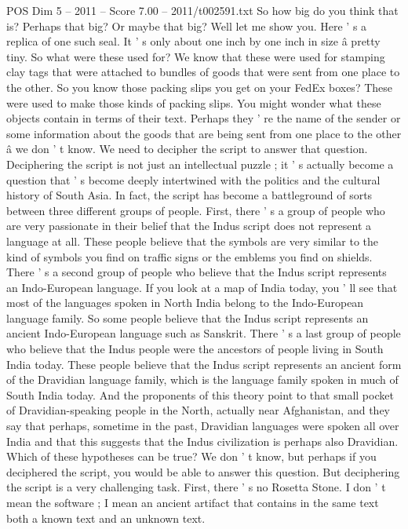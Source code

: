 \begin{textsample}{POS Dim 5 – 2011 – Score 7.00 – 2011/t002591.txt}
So how big do you think that is?
Perhaps that big?
Or maybe that big?
Well let me show you.
Here ' s a replica of one such seal.
It ' s only about one inch by one inch in size â pretty tiny.
So what were these used for?
We know that these were used for stamping clay tags that were attached to bundles of goods that were sent from one place to the other.
So you know those packing slips you get on your FedEx boxes?
These were used to make those kinds of packing slips.
You might wonder what these objects contain in terms of their text.
Perhaps they ' re the name of the sender or some information about the goods that are being sent from one place to the other â we don ' t know.
We need to decipher the script to answer that question.
Deciphering the script is not just an intellectual puzzle ; it ' s actually become a question that ' s become deeply intertwined with the politics and the cultural history of South Asia.
In fact, the script has become a battleground of sorts between three different groups of people.
First, there ' s a group of people who are very passionate in their belief that the Indus script does not represent a language at all.
These people believe that the symbols are very similar to the kind of symbols you find on traffic signs or the emblems you find on shields.
There ' s a second group of people who believe that the Indus script represents an Indo-European language.
If you look at a map of India today, you ' ll see that most of the languages spoken in North India belong to the Indo-European language family.
So some people believe that the Indus script represents an ancient Indo-European language such as Sanskrit.
There ' s a last group of people who believe that the Indus people were the ancestors of people living in South India today.
These people believe that the Indus script represents an ancient form of the Dravidian language family, which is the language family spoken in much of South India today.
And the proponents of this theory point to that small pocket of Dravidian-speaking people in the North, actually near Afghanistan, and they say that perhaps, sometime in the past, Dravidian languages were spoken all over India and that this suggests that the Indus civilization is perhaps also Dravidian.
Which of these hypotheses can be true?
We don ' t know, but perhaps if you deciphered the script, you would be able to answer this question.
But deciphering the script is a very challenging task.
First, there ' s no Rosetta Stone.
I don ' t mean the software ; I mean an ancient artifact that contains in the same text both a known text and an unknown text.

\end{textsample}
